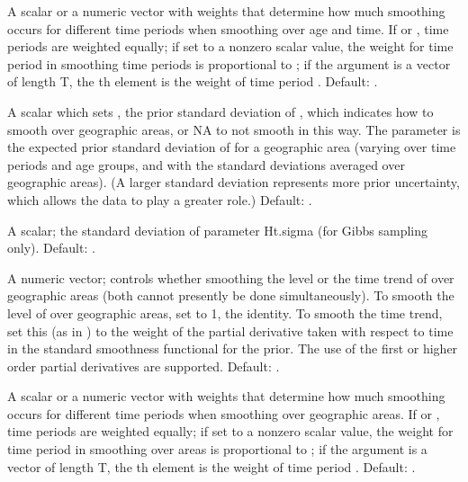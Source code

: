 \begin{Arguments}
\begin{ldescription}
\item[\code{Hat.time.weight}] A scalar or a numeric vector with weights that
determine how much smoothing occurs for different time periods when
smoothing over age and time. If  or , time periods are weighted
equally; if set to a nonzero scalar value, the weight for time
period  in smoothing time periods is proportional to 
; if the argument is a vector of length T, the 
th element is the weight of time period . Default: .

\item[\code{Hct.sigma}] A scalar which sets , the prior standard
deviation of , which indicates how to smooth   over
geographic areas, or NA to not smooth in this way. The parameter 
 is the expected prior standard deviation of  for a
geographic area (varying over time periods and age groups, and with
the standard deviations averaged over geographic areas). (A larger
standard deviation represents more prior uncertainty, which allows
the data to play a greater role.) Default: .

\item[\code{Hct.sigma.sd}] A scalar; the standard deviation of parameter
Ht.sigma (for Gibbs sampling only). Default: .

\item[\code{Hct.t.deriv}] A numeric vector; controls whether smoothing the
level or the time trend of  over geographic areas (both
cannot presently be done simultaneously). To smooth the level of 
 over geographic areas, set to 1, the identity. To smooth the
time trend, set this (as in ) to the weight of the
partial derivative taken with respect to time in the standard
smoothness functional for the prior. The use of the first or higher
order partial derivatives are supported. Default: .

\item[\code{Hct.time.weight}] A scalar or a numeric vector with weights
that determine how much smoothing occurs for different time periods
when smoothing over geographic areas. If  or , time periods are
weighted equally; if set to a nonzero scalar value, the weight for
time period  in smoothing over areas is proportional to 
; if the argument is a vector of length T, the 
th element is the weight of time period . Default: . 



\end{ldescription}
\end{Arguments}
